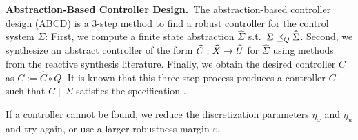\smallskip
\noindent\textbf{Abstraction-Based Controller Design.}\
The abstraction-based controller design (ABCD) \cite{reissig2016feedback} is a $3$-step method to find a robust controller for the control system $\Sigma$:
First, we compute a finite state abstraction $\widehat{\Sigma}$ s.t.\ $\Sigma \preceq_{Q} \widehat{\Sigma}$.
Second, we synthesize an abstract controller of the form $\widehat{C}:\widehat{X}\rightarrow \widehat{U}$ for $\widehat{\Sigma}$ using methods from the reactive synthesis literature.
Finally, we obtain the desired controller $C$ as $C:=\widehat{C}\circ Q$.
It is known that this three step process produces a controller $C$ such that $C\parallel \Sigma$ satisfies the specification \cite{reissig2016feedback}.

If a controller cannot be found, we reduce the discretization parameters $\eta_x$ and $\eta_u$ and try again,
or use a larger robustness margin $\varepsilon$.




